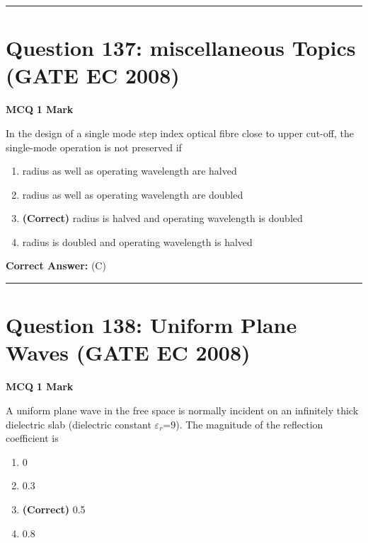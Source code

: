 \documentclass[11pt,a4paper]{article}
\begin{document}
\vspace{1.5em}
\hrule
\vspace{1.5em}

\section*{Question 137: miscellaneous Topics (GATE EC 2008)}
\noindent \textbf{\color{primary}MCQ} \hfill \textbf{\color{secondary}1 Mark}


\noindent In the design of a single mode step index optical fibre close to upper cut-off, the
single-mode operation is not preserved if


\begin{enumerate}[label=(\Alph*)]
    \item radius as well as operating wavelength are halved
    \item radius as well as operating wavelength are doubled
    \item \textbf{(Correct)} radius is halved and operating wavelength is doubled
    \item radius is doubled and operating wavelength is halved
\end{enumerate}

\noindent \textbf{Correct Answer:} (C)


\vspace{1.5em}
\hrule
\vspace{1.5em}

\section*{Question 138: Uniform Plane Waves (GATE EC 2008)}
\noindent \textbf{\color{primary}MCQ} \hfill \textbf{\color{secondary}1 Mark}


\noindent A uniform plane wave in the free space is normally incident on an infinitely
thick dielectric slab (dielectric constant $\varepsilon_{r}$=9). The magnitude of the reflection coefficient is


\begin{enumerate}[label=(\Alph*)]
    \item 0
    \item 0.3
    \item \textbf{(Correct)} 0.5
    \item 0.8
\end{enumerate}
\end{document}
